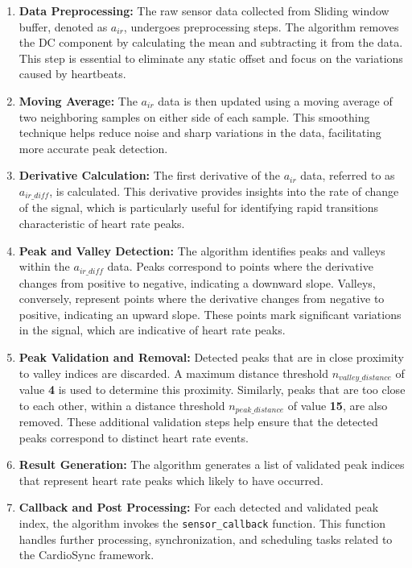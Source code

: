 \begin{enumerate}
    \item \textbf{Data Preprocessing:} The raw sensor data collected from Sliding window buffer, denoted as \(a_{ir}\), undergoes preprocessing steps. The algorithm removes the DC component by calculating the mean and subtracting it from the data. This step is essential to eliminate any static offset and focus on the variations caused by heartbeats.
    
    \item \textbf{Moving Average:} The \(a_{ir}\) data is then updated using a moving average of two neighboring samples on either side of each sample. This smoothing technique helps reduce noise and sharp variations in the data, facilitating more accurate peak detection.
    
    \item \textbf{Derivative Calculation:} The first derivative of the \(a_{ir}\) data, referred to as \(a_{ir\_diff}\), is calculated. This derivative provides insights into the rate of change of the signal, which is particularly useful for identifying rapid transitions characteristic of heart rate peaks.
    
    \item \textbf{Peak and Valley Detection:} The algorithm identifies peaks and valleys within the \(a_{ir\_diff}\) data. Peaks correspond to points where the derivative changes from positive to negative, indicating a downward slope. Valleys, conversely, represent points where the derivative changes from negative to positive, indicating an upward slope. These points mark significant variations in the signal, which are indicative of heart rate peaks.
    
    \item \textbf{Peak Validation and Removal:} Detected peaks that are in close proximity to valley indices are discarded. A maximum distance threshold \(n_{valley\_distance}\) of value \textbf{4} is used to determine this proximity. Similarly, peaks that are too close to each other, within a distance threshold \(n_{peak\_distance}\) of value \textbf{15}, are also removed. These additional validation steps help ensure that the detected peaks correspond to distinct heart rate events.
    
    \item \textbf{Result Generation:} The algorithm generates a list of validated peak indices that represent heart rate peaks which likely to have occurred.
    
    \item \textbf{Callback and Post Processing:} For each detected and validated peak index, the algorithm invokes the \texttt{sensor\_callback} function. This function handles further processing, synchronization, and scheduling tasks related to the CardioSync framework.
\end{enumerate}

